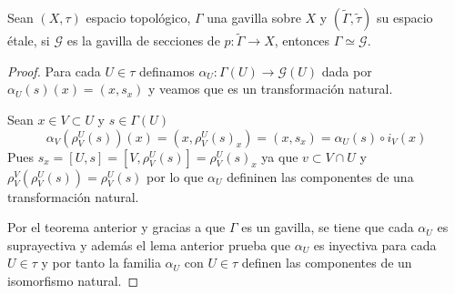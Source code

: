 \documentclass[14pt]{extarticle}
\begin{document}
\begin{teorema}{}{}
    Sean $(X,\tau)$ espacio topológico, 
    $\Gamma$ una gavilla sobre $X$ y 
    $(\widetilde{\Gamma},\tilde{\tau})$ su espacio étale,
    si $\mathcal{G}$ es la gavilla de secciones
    de $p:\widetilde{\Gamma}\rightarrow X$, entonces
    $\Gamma \simeq \mathcal{G}$.
\end{teorema}
\begin{proof}
    Para cada $U\in \tau$ definamos
    $\alpha_U:\Gamma(U)\rightarrow \mathcal{G}(U)$
    dada por $\alpha_U(s)(x)=(x,s_x)$ y veamos que 
    es un transformación natural.

    Sean $x\in V\subset U$ y $s\in \Gamma(U)$
    $$\alpha_V(\rho_{V}^{U}(s))(x)
    =(x, \rho_{V}^{U}(s)_x)
    =(x,s_x)=\alpha_U(s)\circ i_V (x)$$
    Pues $s_x=[U,s]=[V,\rho_{V}^{U}(s)]=\rho_{V}^{U}(s)_x$
    ya que $v\subset V\cap U$ y $\rho_{V}^{V}(\rho_{V}^{U}(s))=\rho_{V}^{U}(s)$
    por lo que $\alpha_U$ defininen las componentes de una transformación
    natural.

    Por el teorema anterior y gracias a que 
    $\Gamma$ es un gavilla, se tiene que cada 
    $\alpha_U$ es suprayectiva y además el lema anterior prueba que 
    $\alpha_U$ es inyectiva para cada 
    $U\in \tau$ y por tanto la familia $\alpha_U$ con
    $U\in \tau$ definen las componentes 
    de un isomorfismo natural.
\end{proof}
\end{document}

